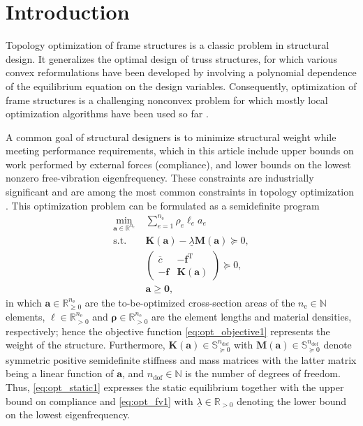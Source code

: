 \documentclass[final,onefignum,onetabnum]{siamart220329}
\begin{document}
\section{Introduction}

Topology optimization of frame structures is a classic problem in structural design. It generalizes the optimal design of truss structures, for which various convex reformulations have been developed \cite{Achtziger2008,Kocvara2017} by involving a polynomial dependence of the equilibrium equation on the design variables. Consequently, optimization of frame structures is a challenging nonconvex problem for which mostly local optimization algorithms have been used so far \cite{Yu2004,Yamada2015}.

A common goal of structural designers is to minimize structural weight while meeting performance requirements, which in this article include upper bounds on work performed by external forces (compliance), and lower bounds on the lowest nonzero free-vibration eigenfrequency.  These constraints are industrially significant and are among the most common constraints in topology optimization \cite{Bendsoe2004,Tyburec2019}. This optimization problem can be formulated as a semidefinite program \cite{Achtziger2007}
%
\vspace{-2mm}\begin{subequations}\label{eq:opt1}
\begin{align}
	\min_{\mathbf{a}\in \mathbb{R}^{n_{\mathrm{e}}}}\; & \sum_{e=1}^{n_\mathrm{e} } \rho_e \ell_e a_e\label{eq:opt_objective1}\\
	\text{s.t.}\; & \mathbf{K} (\mathbf{a}) - \underline{\lambda} \mathbf{M}(\mathbf{a}) \succeq 0,\label{eq:opt_fv1}\\
	& \begin{pmatrix}
		\overline{c} & -\mathbf{f}^\mathrm{T}\\
		-\mathbf{f} & \mathbf{K}(\mathbf{a})
	\end{pmatrix} \succeq 0,\label{eq:opt_static1}\\
	& \mathbf{a} \ge \mathbf{0},\label{eq:opt_nonneg1}
\end{align}
\end{subequations}
%
in which $\mathbf{a} \in \mathbb{R}^{n_\mathrm{e}}_{\ge 0}$ are the to-be-optimized cross-section areas of the $n_\mathrm{e} \in \mathbb{N}$ elements, $\bm{\ell} \in \mathbb{R}^{n_\mathrm{e}}_{>0}$ and $\bm{\rho} \in \mathbb{R}^{n_\mathrm{e}}_{>0}$ are the element lengths and material densities, respectively; hence the objective function \eqref{eq:opt_objective1} represents the weight of the structure. Furthermore, $\mathbf{K}(\mathbf{a}) \in \mathbb{S}^{n_\mathrm{dof}}_{\succeq0}$ with $\mathbf{M}(\mathbf{a}) \in \mathbb{S}^{n_\mathrm{dof}}_{\succeq 0}$ denote symmetric positive semidefinite stiffness and mass matrices with the latter matrix being a linear function of $\mathbf{a}$, and $n_\mathrm{dof} \in \mathbb{N}$ is the number of degrees of freedom. Thus, \eqref{eq:opt_static1} expresses the static equilibrium together with the upper bound on compliance and \eqref{eq:opt_fv1} with $\underline{\lambda} \in \mathbb{R}_{>0}$ {denoting} the lower bound on the lowest eigenfrequency.
\end{document}
